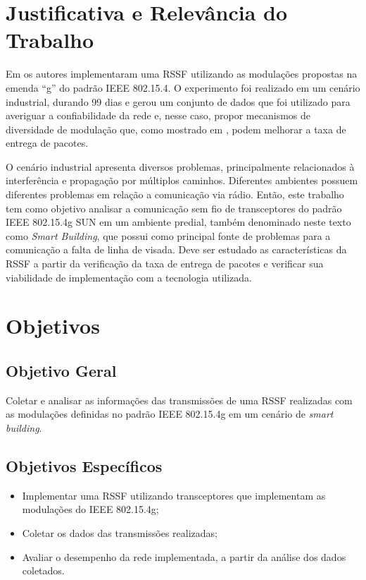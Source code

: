 \section{Justificativa e Relevância do Trabalho}
\label{sec:justificativa}
Em \cite{tuset2020dataset} os autores implementaram uma RSSF utilizando as modulações propostas na emenda ``g'' do padrão IEEE 802.15.4. O experimento foi realizado em um cenário industrial, durando 99 dias e gerou um conjunto de dados que foi utilizado para averiguar a confiabilidade da rede e, nesse caso, propor mecanismos de diversidade de modulação que, como mostrado em \cite{gomes2020improving}, podem melhorar a taxa de entrega de pacotes.

O cenário industrial apresenta diversos problemas, principalmente relacionados à interferência e propagação por múltiplos caminhos. Diferentes ambientes possuem diferentes problemas em relação a comunicação via rádio. Então, este trabalho tem como objetivo analisar a comunicação sem fio de transceptores do padrão IEEE 802.15.4g SUN em um ambiente predial, também denominado neste texto como \emph{Smart Building}, que possui como principal fonte de problemas para a comunicação a falta de linha de visada. Deve ser estudado as características da RSSF a partir da verificação da taxa de entrega de pacotes e verificar sua viabilidade de implementação com a tecnologia utilizada.

\section{Objetivos}
\label{sec:objetivos}

\subsection{Objetivo Geral}
\label{subsec:objGeral}
Coletar e analisar as informações das transmissões de uma RSSF realizadas com as modulações definidas no padrão IEEE 802.15.4g em um cenário de \emph{smart building}.


\subsection{Objetivos Específicos}
\label{subsec:objespecificos}
\begin{itemize}
    \item Implementar uma RSSF utilizando transceptores que implementam as modulações do IEEE 802.15.4g;
    \item Coletar os dados das transmissões realizadas;
    \item Avaliar o desempenho da rede implementada, a partir da análise dos dados coletados.
\end{itemize}


